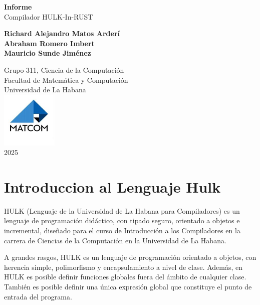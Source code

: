\documentclass[a4paper, 12pt]{article}
\begin{document}
\graphicspath{{./}}

\begin{titlepage}
    \centering
    \vspace*{2cm}
    {\huge\bfseries Informe\\[0.4cm]}
    {\LARGE Compilador HULK-In-RUST\\}
    \vspace*{2cm}
    
     
    {\Large \textbf{Richard Alejandro Matos Arderí}\\[0.5cm]}
    {\Large \textbf{Abraham Romero Imbert}\\[0.5cm]}
    {\Large \textbf{Mauricio Sunde Jiménez}\\[0.5cm]}
    
    {\Large Grupo 311, Ciencia de la Computación\\[0.5cm]}
    {\Large Facultad de Matemática y Computación\\[0.5cm]}
    {\Large Universidad de La Habana\\[0.5cm]}
    \vfill
    \includegraphics[width=0.2\textwidth, height=0.2\textheight]{Images/MATCOM.jpg}\\[0.5cm]
    {\Large 2025}
\end{titlepage}

\newpage
\tableofcontents
\newpage

\section{Introduccion al Lenguaje Hulk}

HULK (Lenguaje de la Universidad de La Habana para Compiladores) es un lenguaje de programación didáctico, con tipado seguro, orientado a objetos e incremental, diseñado para el curso de Introducción a los Compiladores en la carrera de Ciencias de la Computación en la Universidad de La Habana.

A grandes rasgos, HULK es un lenguaje de programación orientado a objetos, con herencia simple, polimorfismo y encapsulamiento a nivel de clase. Además, en HULK es posible definir funciones globales fuera del ámbito de cualquier clase. También es posible definir una única expresión global que constituye el punto de entrada del programa.
\end{document}
